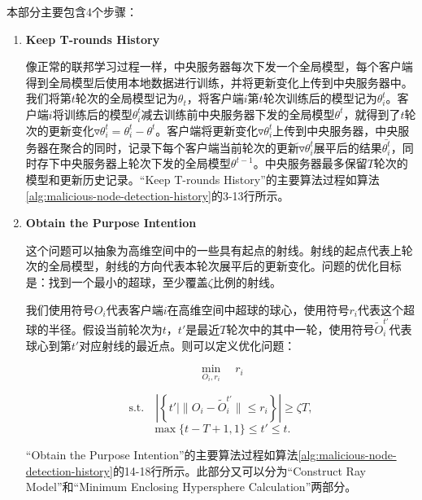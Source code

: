 \documentclass[lettersize,journal]{IEEEtran}
\begin{document}
本部分主要包含4个步骤：

\begin{enumerate}

\item \textbf{Keep T-rounds History}

像正常的联邦学习过程一样，中央服务器每次下发一个全局模型，每个客户端得到全局模型后使用本地数据进行训练，并将更新变化上传到中央服务器中。我们将第$t$轮次的全局模型记为$\theta_t$，将客户端$i$第$t$轮次训练后的模型记为$\theta^t_i$。客户端$i$将训练后的模型$\theta^t_{i}$减去训练前中央服务器下发的全局模型$\theta^t$，就得到了$t$轮次的更新变化$\triangledown \theta^t_{i}=\theta^t_{i}-\theta^t$。客户端将更新变化$\triangledown \theta^t_{i}$上传到中央服务器，中央服务器在聚合的同时，记录下每个客户端当前轮次的更新$\triangledown \theta^t_{i}$展平后的结果$\bar{\theta_i^t}$，同时存下中央服务器上轮次下发的全局模型$\theta^{t-1}$。中央服务器最多保留$T$轮次的模型和更新历史记录。“Keep T-rounds History”的主要算法过程如算法\ref{alg:malicious-node-detection-history}的3-13行所示。%

\item \textbf{Obtain the Purpose Intention}

这个问题可以抽象为高维空间中的一些具有起点的射线。射线的起点代表上轮次的全局模型，射线的方向代表本轮次展平后的更新变化。问题的优化目标是：找到一个最小的超球，至少覆盖$\zeta$比例的射线。

我们使用符号$O_i$代表客户端$i$在高维空间中超球的球心，使用符号$r_i$代表这个超球的半径。假设当前轮次为$t$，$t'$是最近$T$轮次中的其中一轮，使用符号$\tilde O_i^{t'}$代表球心到第$t'$对应射线的最近点。则可以定义优化问题：

\begin{equation}
    \min_{O_i, r_i} \quad r_i
\end{equation}

\begin{equation} 
\text{s.t.} \quad \left| \left\{ t' \mid \| O_i - \tilde{O}_{i}^{t'} \| \leq r_i \right\} \right| \geq \zeta T,
\end{equation}
\begin{equation} 
    \max\{t-T+1, 1\}\leq  t'\leq t.
\end{equation}

“Obtain the Purpose Intention”的主要算法过程如算法\ref{alg:malicious-node-detection-history}的14-18行所示。此部分又可以分为“Construct Ray Model”和“Minimum Enclosing Hypersphere Calculation”两部分。


\end{enumerate}
\end{document}
